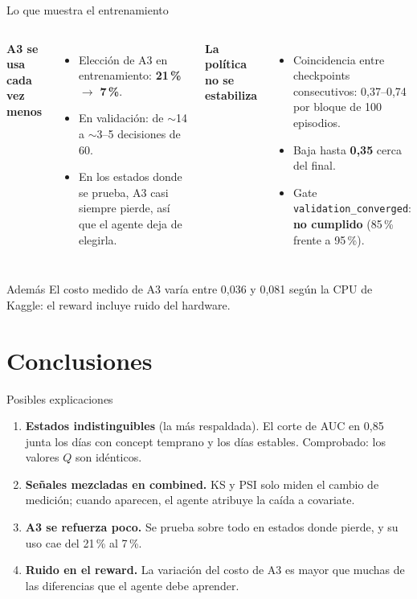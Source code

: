 \documentclass[aspectratio=169,10pt,xcolor=table]{beamer}
\newcommand{\hl}[1]{\textcolor{DARLblue}{\textbf{#1}}}
\begin{document}
\begin{frame}{Lo que muestra el entrenamiento}
\begin{columns}[T]
\textbf{A3 se usa cada vez menos}
\begin{itemize}
  \item Elección de A3 en entrenamiento: \hl{21\,\%} $\rightarrow$ \hl{7\,\%}.
  \item En validación: de $\sim$14 a $\sim$3--5 decisiones de 60.
  \item En los estados donde se prueba, A3 casi siempre pierde, así que el
        agente deja de elegirla.
\end{itemize}
\textbf{La política no se estabiliza}
\begin{itemize}
  \item Coincidencia entre checkpoints consecutivos: 0,37--0,74 por bloque de
        100 episodios.
  \item Baja hasta \textcolor{DARLred}{\textbf{0,35}} cerca del final.
  \item Gate \texttt{validation\_converged}: \textcolor{DARLred}{\textbf{no cumplido}} (85\,\% frente a 95\,\%).
\end{itemize}
\end{columns}
\vspace{0.8em}
\begin{block}{Además}
El costo medido de A3 varía entre 0,036 y 0,081 según la CPU de Kaggle: el
reward incluye ruido del hardware.
\end{block}
\end{frame}

\section{Conclusiones}
\begin{frame}{Posibles explicaciones}
\begin{enumerate}
  \item \textbf{Estados indistinguibles} (la más respaldada).
        El corte de AUC en 0,85 junta los días con concept temprano y los días
        estables. Comprobado: los valores $Q$ son idénticos.
  \item \textbf{Señales mezcladas en combined.}
        KS y PSI solo miden el cambio de medición; cuando aparecen, el agente
        atribuye la caída a covariate.
  \item \textbf{A3 se refuerza poco.}
        Se prueba sobre todo en estados donde pierde, y su uso cae del 21\,\% al 7\,\%.
  \item \textbf{Ruido en el reward.}
        La variación del costo de A3 es mayor que muchas de las diferencias que
        el agente debe aprender.
\end{enumerate}
\end{frame}
\end{document}
